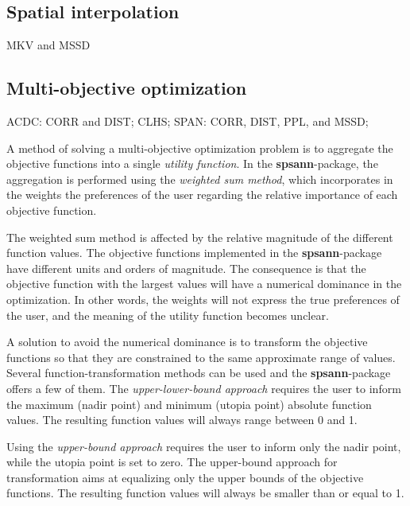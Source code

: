 \subsection{Spatial interpolation}

MKV and MSSD

\subsection{Multi-objective optimization}

ACDC: CORR and DIST;
CLHS;
SPAN: CORR, DIST, PPL, and MSSD;

A method of solving a multi-objective optimization problem is to aggregate 
the objective functions into a single \textit{utility function}. In the
\textbf{spsann}-package, the aggregation is performed using the \textit{weighted 
sum method}, which incorporates in the weights the preferences of the user 
regarding the relative importance of each objective function.

The weighted sum method is affected by the relative magnitude of the 
different function values. The objective functions implemented in the
\textbf{spsann}-package have different units and orders of magnitude. The 
consequence is that the objective function with the largest values will have 
a numerical dominance in the optimization. In other words, the weights will 
not express the true preferences of the user, and the meaning of the utility 
function becomes unclear.

A solution to avoid the numerical dominance is to transform the objective
functions so that they are constrained to the same approximate range of 
values. Several function-transformation methods can be used and the 
\textbf{spsann}-package offers a few of them. The \textit{upper-lower-bound 
approach} requires the user to inform the maximum (nadir point) and minimum 
(utopia point) absolute function values. The resulting function values will 
always range between 0 and 1.

Using the \textit{upper-bound approach} requires the user to inform only the
nadir point, while the utopia point is set to zero. The upper-bound approach
for transformation aims at equalizing only the upper bounds of the objective 
functions. The resulting function values will always be smaller than or equal
to 1.

